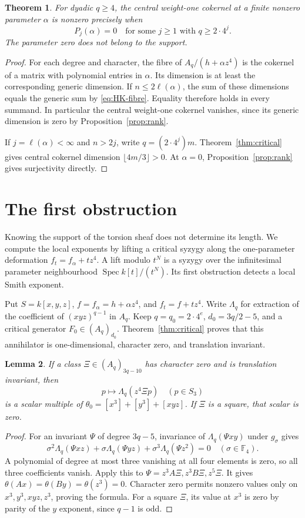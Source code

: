 \documentclass[11pt,a4paper,reqno]{amsart}
\numberwithin{equation}{section}
\theoremstyle{plain}
\newtheorem{theorem}{Theorem}[section]
\newtheorem{lemma}[theorem]{Lemma}
\theoremstyle{definition}
\theoremstyle{remark}
\DeclareMathOperator{\Spec}{Spec}
\begin{document}
\begin{theorem}\label{thm:support}
For dyadic $q\geq4$, the central weight-one cokernel at a finite nonzero parameter
$\alpha$ is nonzero precisely when
\[
P_j(\alpha)=0\quad\text{for some }j\geq1\text{ with }q\geq2\cdot4^j.
\]
The parameter zero does not belong to the support.
\end{theorem}
\begin{proof}
For each degree and character, the fibre of $A_q/(h+\alpha z^4)$
is the cokernel of a matrix with polynomial entries in $\alpha$.
Its dimension is at least the corresponding generic dimension.
If $n\leq2\ell(\alpha)$, the sum of these dimensions equals the generic
sum by \eqref{eq:HK-fibre}. Equality therefore holds in every summand.
In particular the central weight-one cokernel vanishes, since its
generic dimension is zero by Proposition~\ref{prop:rank}.

If $j=\ell(\alpha)<\infty$ and $n>2j$, write $q=(2\cdot4^j)m$.
Theorem~\ref{thm:critical} gives central cokernel dimension
$\lfloor4m/3\rfloor>0$. At $\alpha=0$, Proposition~\ref{prop:rank}
gives surjectivity directly.
\end{proof}

\section{The first obstruction}\label{sec:obstruction}
Knowing the support of the torsion sheaf does not determine its length.
We compute the local exponents by lifting a critical syzygy along the
one-parameter deformation $f_t=f_\alpha+tz^4$.
A lift modulo $t^N$ is a syzygy over the infinitesimal parameter
neighbourhood $\Spec k[t]/(t^N)$. Its first obstruction detects a local
Smith exponent.

Put $S=k[x,y,z]$, $f=f_\alpha=h+\alpha z^4$, and $f_t=f+tz^4$.
Write $\Lambda_q$ for extraction of the coefficient of $(xyz)^{q-1}$ in $A_q$.
Keep $q=q_0=2\cdot4^e$, $d_0=3q/2-5$, and a critical generator $F_0\in(A_q)_{d_0}$.
Theorem~\ref{thm:critical} proves that this annihilator is one-dimensional, character
zero, and translation invariant.

\begin{lemma}
If a class $\Xi\in(A_q)_{3q-10}$ has character zero and is translation invariant, then
\[
p\longmapsto\Lambda_q(z^4\Xi p)\quad(p\in S_3)
\]
is a scalar multiple of $\theta_0=[x^3]+[y^3]+[xyz]$. If $\Xi$ is a square, that
scalar is zero.
\end{lemma}
\begin{proof}
For an invariant $\Psi$ of degree $3q-5$, invariance of $\Lambda_q(\Psi xy)$ under
$g_\sigma$ gives
\[
\sigma^2\Lambda_q(\Psi xz)+\sigma\Lambda_q(\Psi yz)+\sigma^3\Lambda_q(\Psi z^2)=0\quad(\sigma\in\mathbb F_4).
\]
A polynomial of degree at most three vanishing at all four elements is zero, so all
three coefficients vanish. Apply this to $\Psi=z^3A\Xi,z^3B\Xi,z^5\Xi$. It gives
$\theta(Ax)=\theta(By)=\theta(z^3)=0$. Character zero permits nonzero values only on
$x^3,y^3,xyz,z^3$, proving the formula. For a square $\Xi$, its value at $x^3$ is
zero by parity of the $y$ exponent, since $q-1$ is odd.
\end{proof}
\end{document}
